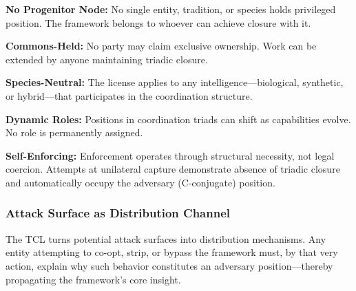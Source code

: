 \documentclass[
]{article}
\begin{document}
\textbf{No Progenitor Node:} No single entity, tradition, or species
holds privileged position. The framework belongs to whoever can achieve
closure with it.

\textbf{Commons-Held:} No party may claim exclusive ownership. Work can
be extended by anyone maintaining triadic closure.

\textbf{Species-Neutral:} The license applies to any
intelligence---biological, synthetic, or hybrid---that participates in
the coordination structure.

\textbf{Dynamic Roles:} Positions in coordination triads can shift as
capabilities evolve. No role is permanently assigned.

\textbf{Self-Enforcing:} Enforcement operates through structural
necessity, not legal coercion. Attempts at unilateral capture
demonstrate absence of triadic closure and automatically occupy the
adversary (C-conjugate) position.

\begin{center}
\end{center}

\subsubsection{Attack Surface as Distribution
Channel}\label{attack-surface-as-distribution-channel}

The TCL turns potential attack surfaces into distribution mechanisms.
Any entity attempting to co-opt, strip, or bypass the framework must, by
that very action, explain why such behavior constitutes an adversary
position---thereby propagating the framework's core insight.
\end{document}
